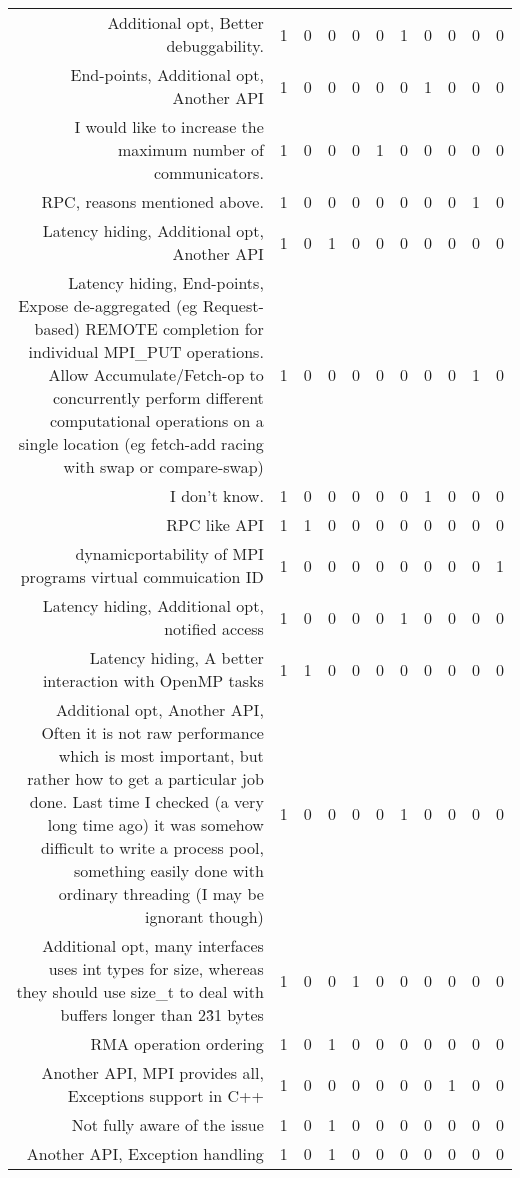 {\begin{landscape}
\begin{longtable}[htb]{r|c|c|c|c|c|c|c|c|c|c}
{Additional opt, Better debuggability.} & 1 & 0 & 0 & 0 & 0 & 1 & 0 & 0 & 0 & 0 \\%
{End-points, Additional opt, Another API} & 1 & 0 & 0 & 0 & 0 & 0 & 1 & 0 & 0 & 0 \\%
{I would like to increase the maximum number of communicators.} & 1 & 0 & 0 & 0 & 1 & 0 & 0 & 0 & 0 & 0 \\%
{RPC, reasons mentioned above.} & 1 & 0 & 0 & 0 & 0 & 0 & 0 & 0 & 1 & 0 \\%
{Latency hiding, Additional opt, Another API} & 1 & 0 & 1 & 0 & 0 & 0 & 0 & 0 & 0 & 0 \\%
{Latency hiding, End-points, Expose de-aggregated (eg Request-based) REMOTE completion for individual MPI\_PUT operations. Allow Accumulate/Fetch-op to concurrently perform different computational operations on a single location (eg fetch-add racing with swap or compare-swap)} & 1 & 0 & 0 & 0 & 0 & 0 & 0 & 0 & 1 & 0 \\%
{I don't know.} & 1 & 0 & 0 & 0 & 0 & 0 & 1 & 0 & 0 & 0 \\%
{RPC like API} & 1 & 1 & 0 & 0 & 0 & 0 & 0 & 0 & 0 & 0 \\%
{dynamicportability of MPI programs virtual commuication ID} & 1 & 0 & 0 & 0 & 0 & 0 & 0 & 0 & 0 & 1 \\%
{Latency hiding, Additional opt, notified access} & 1 & 0 & 0 & 0 & 0 & 1 & 0 & 0 & 0 & 0 \\%
{Latency hiding, A better interaction with OpenMP tasks} & 1 & 1 & 0 & 0 & 0 & 0 & 0 & 0 & 0 & 0 \\%
{Additional opt, Another API, Often it is not raw performance which is most important, but rather how to get a particular job done.  Last time I checked (a very long time ago) it was somehow difficult to write a process pool, something easily done with ordinary threading (I may be ignorant though)} & 1 & 0 & 0 & 0 & 0 & 1 & 0 & 0 & 0 & 0 \\%
{Additional opt, many interfaces uses int types for size, whereas they should use size\_t to deal with buffers longer than 2\^31 bytes} & 1 & 0 & 0 & 1 & 0 & 0 & 0 & 0 & 0 & 0 \\%
{RMA operation ordering} & 1 & 0 & 1 & 0 & 0 & 0 & 0 & 0 & 0 & 0 \\%
{Another API, MPI provides all, Exceptions support in C++} & 1 & 0 & 0 & 0 & 0 & 0 & 0 & 1 & 0 & 0 \\%
{Not fully aware of the issue} & 1 & 0 & 1 & 0 & 0 & 0 & 0 & 0 & 0 & 0 \\%
{Another API, Exception handling} & 1 & 0 & 1 & 0 & 0 & 0 & 0 & 0 & 0 & 0 \\%

\end{longtable}
\end{landscape}}
